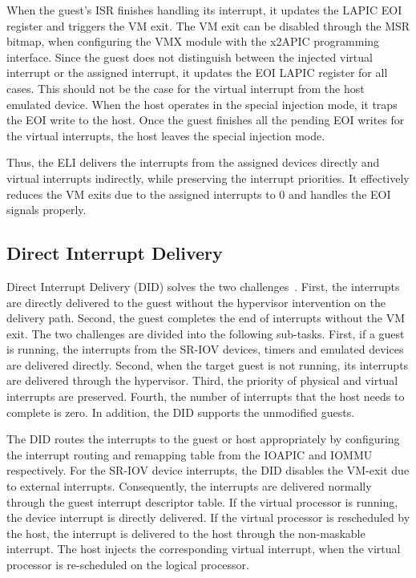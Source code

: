 {When the guest's ISR finishes handling its interrupt, it
updates the LAPIC EOI register and triggers the VM exit. The
VM exit can be disabled through the MSR bitmap, when
configuring the VMX module with the x2APIC programming
interface. Since the guest does not distinguish between the
injected virtual interrupt or the assigned interrupt, it
updates the EOI LAPIC register for all cases. This should not
be the case for the virtual interrupt from the host emulated
device. When the host operates in the special injection mode,
it traps the EOI write to the host. Once the guest finishes
all the pending EOI writes for the virtual interrupts, the
host leaves the special injection mode.

Thus, the ELI delivers the interrupts from the assigned
devices directly and virtual interrupts indirectly, while
preserving the interrupt priorities. It effectively reduces
the VM exits due to the assigned interrupts to 0 and handles
the EOI signals properly.

\subsection{Direct Interrupt Delivery}
Direct Interrupt Delivery (DID) solves the two
challenges~\cite{tu:2015}. First, the interrupts are directly
delivered to the guest without the hypervisor intervention on
the delivery path. Second, the guest completes the end of
interrupts without the VM exit. The two challenges are divided
into the following sub-tasks. First, if a guest is running,
the interrupts from the SR-IOV devices, timers and emulated
devices are delivered directly. Second, when the target guest
is not running, its interrupts are delivered through the
hypervisor. Third, the priority of physical and virtual
interrupts are preserved. Fourth, the number of interrupts
that the host needs to complete is zero. In addition, the DID
supports the unmodified guests.

The DID routes the interrupts to the guest or host
appropriately by configuring the interrupt routing and
remapping table from the IOAPIC and IOMMU respectively. For
the SR-IOV device interrupts, the DID disables the VM-exit due
to external interrupts. Consequently, the interrupts are
delivered normally through the guest interrupt descriptor
table. If the virtual processor is running, the device
interrupt is directly delivered. If the virtual processor is
rescheduled by the host, the interrupt is delivered to the
host through the non-maskable interrupt. The host injects the
corresponding virtual interrupt, when the virtual processor is
re-scheduled on the logical processor.

}
